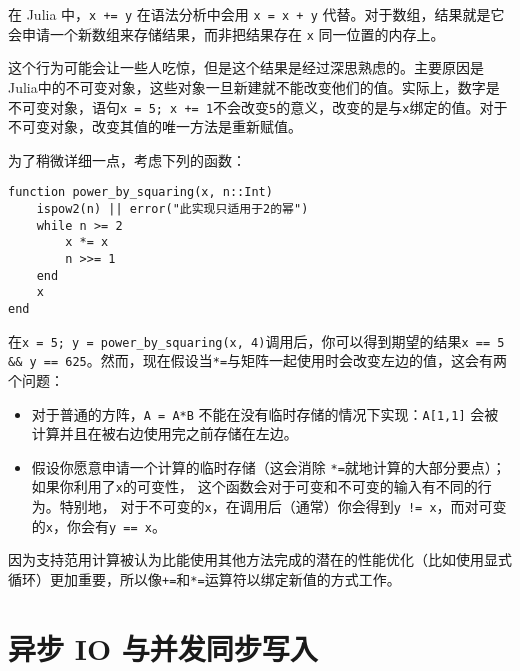 在 Julia 中，\texttt{x += y} 在语法分析中会用 \texttt{x = x + y} 代替。对于数组，结果就是它会申请一个新数组来存储结果，而非把结果存在 \texttt{x} 同一位置的内存上。



这个行为可能会让一些人吃惊，但是这个结果是经过深思熟虑的。主要原因是Julia中的不可变对象，这些对象一旦新建就不能改变他们的值。实际上，数字是不可变对象，语句\texttt{x = 5; x += 1}不会改变\texttt{5}的意义，改变的是与\texttt{x}绑定的值。对于不可变对象，改变其值的唯一方法是重新赋值。



为了稍微详细一点，考虑下列的函数：




\begin{verbatim}
function power_by_squaring(x, n::Int)
    ispow2(n) || error("此实现只适用于2的幂")
    while n >= 2
        x *= x
        n >>= 1
    end
    x
end
\end{verbatim}



在\texttt{x = 5; y = power\_by\_squaring(x, 4)}调用后，你可以得到期望的结果\texttt{x == 5 \&\& y == 625}。然而，现在假设当\texttt{*=}与矩阵一起使用时会改变左边的值，这会有两个问题：



\begin{itemize}
\item 对于普通的方阵，\texttt{A = A*B} 不能在没有临时存储的情况下实现：\texttt{A[1,1]} 会被计算并且在被右边使用完之前存储在左边。


\item 假设你愿意申请一个计算的临时存储（这会消除 \texttt{*=}就地计算的大部分要点）；如果你利用了\texttt{x}的可变性， 这个函数会对于可变和不可变的输入有不同的行为。特别地， 对于不可变的\texttt{x}，在调用后（通常）你会得到\texttt{y != x}，而对可变的\texttt{x}，你会有\texttt{y == x}。

\end{itemize}


因为支持范用计算被认为比能使用其他方法完成的潜在的性能优化（比如使用显式循环）更加重要，所以像\texttt{+=}和\texttt{*=}运算符以绑定新值的方式工作。



\hypertarget{11478691918903630142}{}


\section{异步 IO 与并发同步写入}



